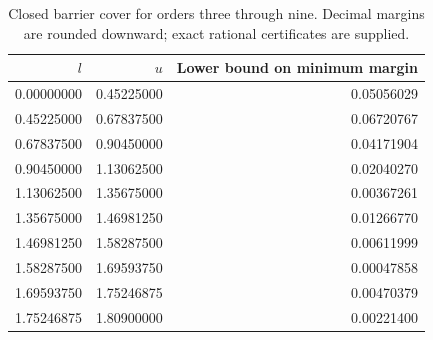 \begin{table}[ht]
\centering
\caption{Closed barrier cover for orders three through nine. Decimal margins are rounded downward; exact rational certificates are supplied.}\label{tab:cover}
\begin{tabular}{rrr}\toprule
$l$ & $u$ & Lower bound on minimum margin\\\midrule
0.00000000 & 0.45225000 & 0.05056029\\
0.45225000 & 0.67837500 & 0.06720767\\
0.67837500 & 0.90450000 & 0.04171904\\
0.90450000 & 1.13062500 & 0.02040270\\
1.13062500 & 1.35675000 & 0.00367261\\
1.35675000 & 1.46981250 & 0.01266770\\
1.46981250 & 1.58287500 & 0.00611999\\
1.58287500 & 1.69593750 & 0.00047858\\
1.69593750 & 1.75246875 & 0.00470379\\
1.75246875 & 1.80900000 & 0.00221400\\
\bottomrule\end{tabular}
\end{table}
